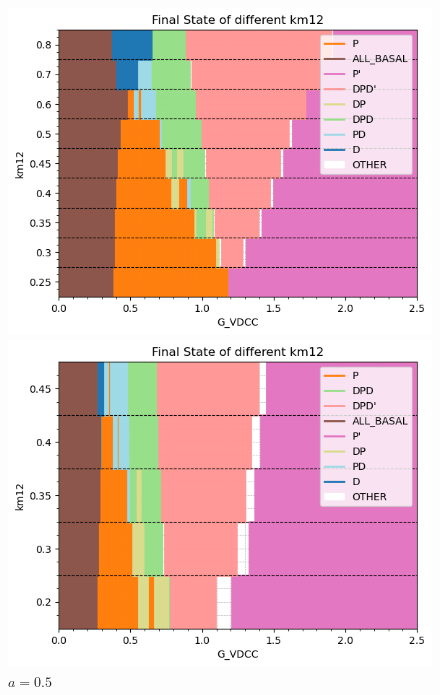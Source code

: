 \documentclass{article}
\begin{document}
\begin{figure}[h]
    \centering
    \begin{minipage}[b]{0.45\textwidth}
        \includegraphics[width=1\textwidth]{a=0.2_final_state.png}
        \caption{$a=0.2$}
        \label{fig:image1}
    \end{minipage}
    \hfill %
    \begin{minipage}[b]{0.45\textwidth}
        \includegraphics[width=\textwidth]{a=0.5_final_state.png}
        \caption{$a=0.5$}
        \label{fig:image2}
    \end{minipage}
\end{figure}\\
\end{document}
